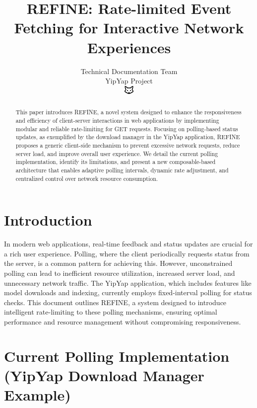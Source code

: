 \documentclass[10pt]{article}
\begin{document}
\title{REFINE: Rate-limited Event Fetching for Interactive Network Experiences}

\author{Technical Documentation Team\\
YipYap Project\\
\includegraphics[width=0.5cm]{favicon.pdf}}

\maketitle

\begin{abstract}
This paper introduces REFINE, a novel system designed to enhance the responsiveness and efficiency of client-server interactions in web applications by implementing modular and reliable rate-limiting for GET requests. Focusing on polling-based status updates, as exemplified by the download manager in the YipYap application, REFINE proposes a generic client-side mechanism to prevent excessive network requests, reduce server load, and improve overall user experience. We detail the current polling implementation, identify its limitations, and present a new composable-based architecture that enables adaptive polling intervals, dynamic rate adjustment, and centralized control over network resource consumption.
\end{abstract}

\section{Introduction}

In modern web applications, real-time feedback and status updates are crucial for a rich user experience. Polling, where the client periodically requests status from the server, is a common pattern for achieving this. However, unconstrained polling can lead to inefficient resource utilization, increased server load, and unnecessary network traffic. The YipYap application, which includes features like model downloads and indexing, currently employs fixed-interval polling for status checks. This document outlines REFINE, a system designed to introduce intelligent rate-limiting to these polling mechanisms, ensuring optimal performance and resource management without compromising responsiveness.

\section{Current Polling Implementation (YipYap Download Manager Example)}
\end{document}
